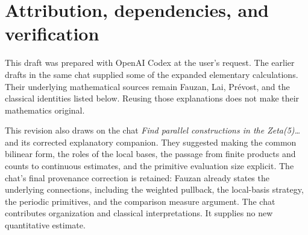 \section{Attribution, dependencies, and verification}\label{app:attribution}

This draft was prepared with OpenAI Codex at the user's request.
The earlier drafts in the same chat supplied some of the expanded
elementary calculations. Their underlying mathematical sources remain
Fauzan, Lai, Pr\'evost, and the classical identities listed below.
Reusing those explanations does not make their mathematics original.

This revision also draws on the chat
\emph{Find parallel constructions in the Zeta(5)\ldots}
and its corrected explanatory companion.
They suggested making the common bilinear form, the roles of the local
bases, the passage from finite products and counts to continuous
estimates, and the primitive evaluation size explicit.
The chat's final provenance correction is retained: Fauzan already
states the underlying connections, including the weighted pullback,
the local-basis strategy, the periodic primitives, and the comparison
measure argument. The chat contributes organization and classical
interpretations. It supplies no new quantitative estimate.

